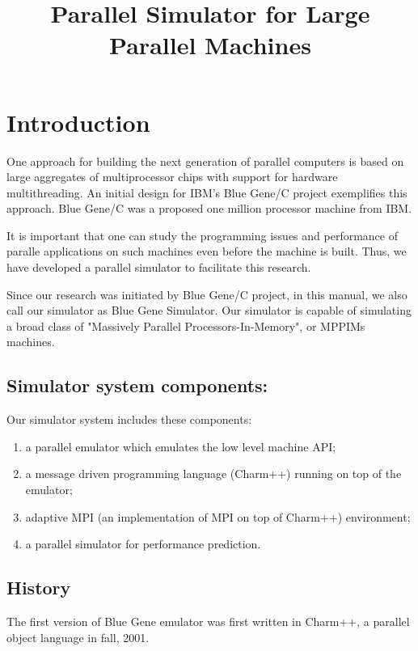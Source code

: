 \documentclass[10pt]{article}
\title{Parallel Simulator for Large Parallel Machines}
\begin{document}
\maketitle

\section{Introduction}

One approach for building the next generation of parallel computers
is based on large aggregates of multiprocessor chips with support
for hardware multithreading. 
An initial design for IBM's Blue Gene/C project exemplifies this approach.
Blue Gene/C was a proposed one million processor machine from IBM.

It is important that one can study the programming issues and performance
of paralle applications on such machines even before the machine is built.
Thus, we have developed a parallel simulator to facilitate this research.

Since our research was initiated by Blue Gene/C project, in this manual, 
we also call our simulator as Blue Gene Simulator.
Our simulator is capable of simulating a broad class of "Massively Parallel
Processors-In-Memory", or MPPIMs machines. 

\subsection{Simulator system components:}

Our simulator system includes these components: 
\begin{enumerate}
\item a parallel emulator which emulates the low level machine API; 
\item a message driven programming language (Charm++) running on top of the emulator; 
\item adaptive MPI (an implementation of MPI on top of Charm++) environment; 
\item a parallel simulator for performance prediction. 
\end{enumerate}

\subsection{History}

The first version of Blue Gene emulator was first written in Charm++, a 
parallel object language in fall, 2001. 
\end{document}
